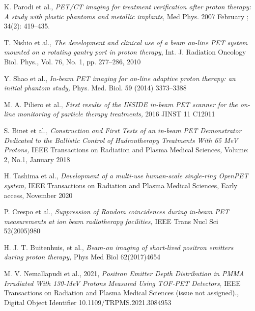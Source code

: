 \documentclass[11pt,a4paper]{article}
\begin{document}
\begin{thebibliography}{9}
K. Parodi et al., \emph{PET/CT imaging for treatment verification after proton therapy: A study with plastic phantoms and metallic implants,} Med Phys. 2007 February ; 34(2): 419–435.



T. Nishio et al., \emph{The development and clinical use of a beam on-line PET system mounted on a rotating gantry port in proton therapy}, Int. J. Radiation Oncology Biol. Phys., Vol. 76, No. 1, pp. 277–286, 2010


Y. Shao et al., \emph{In-beam PET imaging for on-line adaptive proton therapy: an initial phantom study,} Phys. Med. Biol. 59 (2014) 3373–3388

M. A. Piliero et al., \emph{First results of the INSIDE in-beam PET scanner for the on-line monitoring of particle therapy treatments,} 2016 JINST 11 C12011

S. Binet et al., \emph{Construction and First Tests of an in-beam PET Demonstrator Dedicated to the Ballistic Control of Hadrontherapy Treatments With 65 MeV Protons,} 
IEEE Transactions on Radiation and Plasma Medical Sciences, Volume: 2, No.1, January 2018

H. Tashima et al., \emph{Development of a multi-use human-scale single-ring OpenPET system,} IEEE Transactions on Radiation and Plasma Medical Sciences, Early access, November 2020

P. Crespo et al., \emph{Suppression of Random coincidences during in-beam PET measurements at ion beam radiotherapy facilities,}   IEEE Trans Nucl Sci 52(2005)980

H. J. T. Buitenhuis, et al., \emph{Beam-on imaging of short-lived positron emitters during proton therapy,} Phys Med Biol 62(2017)4654

M. V. Nemallapudi et al., 2021, \emph{Positron Emitter Depth Distribution in PMMA Irradiated With 130-MeV Protons Measured Using TOF-PET Detectors,} IEEE Transactions on Radiation and Plasma Medical Sciences (issue not assigned)., Digital Object Identifier 10.1109/TRPMS.2021.3084953 




\end{thebibliography}
\end{document}
